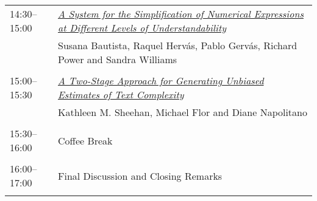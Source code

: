 \begin{tabular}{p{20mm}p{128mm}}
14:30--15:00 & \hyperlink{page.39}{\em A System for the Simplification of Numerical Expressions at Different Levels of Understandability}\\
         & Susana Bautista, Raquel Herv\'{a}s, Pablo Gerv\'{a}s, Richard Power and Sandra Williams \\
\\

15:00--15:30 & \hyperlink{page.49}{\em A Two-Stage Approach for Generating Unbiased Estimates of Text Complexity}\\
         & Kathleen M. Sheehan, Michael Flor and Diane Napolitano \\
\\

15:30--16:00 & Coffee Break \\
\\
16:00--17:00 & Final Discussion and Closing Remarks \\
\\


\end{tabular}
